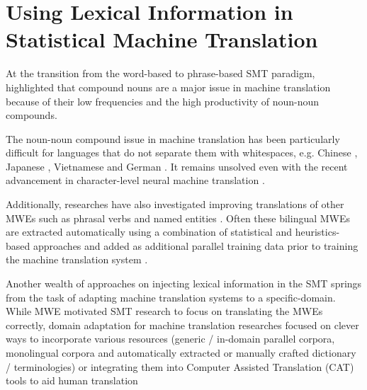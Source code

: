 \section{Using Lexical Information in Statistical Machine Translation}

At the transition from the word-based to phrase-based SMT paradigm, \cite{tanaka2003noun} highlighted that compound nouns are a major issue in machine translation because of their low frequencies and the high productivity of noun-noun compounds. 

The noun-noun compound issue in machine translation has been particularly difficult for languages that do not separate them with whitespaces, e.g. Chinese \citep{wang2007chinese,chang2008optimizing,chang2009disambiguating,pu2015leveraging}, Japanese \citep{kitamura1996automatic,cherny2000translation,baldwin-tanaka:2004:ACLMWE,pinkham2008machine,tsuji2006automatic}, Vietnamese \citep{khanhjapanese} and German \citep{rackow1992automatic,popovic2006statistical,stymne2008german,stymne2013generation,weller2014ComAComA,cap-EtAl:2014:EACL}. It remains unsolved even with the recent advancement in character-level neural machine translation \citep{tran-bisazza-monz:2014:EMNLP2014,daiber2015machine,SennrichHB15}.

Additionally, researches have also investigated improving translations of other MWEs such as phrasal verbs \citep{simova2013improving,kordoni2014multiword,cholakovkordoni2014} and named entities \citep{hermjakob2008nametrans,Nothman2013,manawi2014}. Often these bilingual MWEs are extracted automatically using a combination of statistical and heuristics-based approaches and added as additional parallel training data prior to training the machine translation system \citep{tsvetkov2012extraction}. 

Another wealth of approaches on injecting lexical information in the SMT springs from the task of adapting machine translation systems to a specific-domain. While MWE motivated SMT research to focus on translating the MWEs correctly, domain adaptation for machine translation researches focused on clever ways to incorporate various resources (generic / in-domain parallel corpora, monolingual corpora and automatically extracted or manually crafted dictionary / terminologies) \citep{nanba2009automatic,sanchez2011integrating,arcan2014identification,minarro2015acquisition} or integrating them into Computer Assisted Translation (CAT) tools to aid human translation \citep{tezcan2011smt,skadicnvs2013application}

